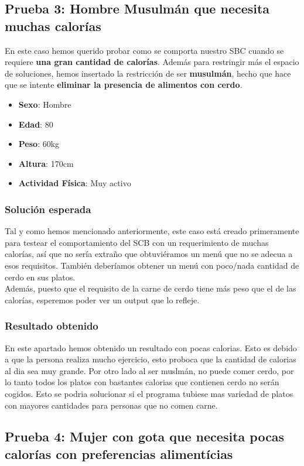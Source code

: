 \documentclass[11]{article}
\begin{document}
\subsection{Prueba 3: Hombre Musulmán que necesita muchas calorías}
En este caso hemos querido probar como se comporta nuestro SBC cuando se requiere \textbf{una gran cantidad de calorías}. Además para restringir más el espacio de soluciones, hemos insertado la restricción de ser \textbf{musulmán}, hecho que hace que se intente \textbf{eliminar la presencia de alimentos con cerdo}. 

\begin{itemize}
\item \textbf{Sexo}: Hombre
\item \textbf{Edad}: 80
\item \textbf{Peso}: 60kg
\item \textbf{Altura}: 170cm
\item \textbf{Actividad Física}: Muy activo
\end{itemize}

\subsubsection{Solución esperada}
Tal y como hemos mencionado anteriormente, este caso está creado primeramente para testear el comportamiento del SCB con un requerimiento de muchas calorías, así que no sería extraño que obtuviéramos un menú que no se adecua a esos requisitos. También deberíamos obtener un menú con poco/nada cantidad de cerdo en sus platos. 
\\
Además, puesto que el requisito de la carne de cerdo tiene más peso que el de las calorías, esperemos poder ver un output que lo refleje. 

\subsubsection{Resultado obtenido}

En este apartado hemos obtenido un resultado con pocas calorias. Esto es debido a que la persona realiza mucho ejercicio, esto proboca que la cantidad de calorias al dia sea muy grande. Por otro lado al ser muslmán, no puede comer cerdo, por lo tanto todos los platos con bastantes calorias que contienen cerdo no serán cogidos.
Esto se podria solucionar si el programa tubiese mas variedad de platos con mayores cantidades para personas que no comen carne.

\subsection{Prueba 4: Mujer con gota que necesita pocas calorías con preferencias alimentícias}
\end{document}
